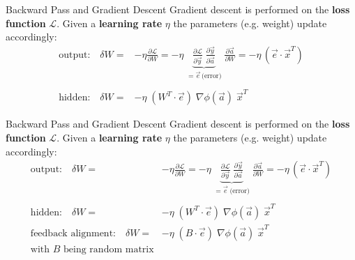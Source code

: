 \documentclass[12pt, aspectratio=169]{beamer}
\begin{document}
\begin{frame}{Backward Pass and Gradient Descent}
Gradient descent is performed on the \textbf{loss function} $\mathcal{L}$. Given a \textbf{learning rate} $\eta$ the parameters (e.g. weight) update accordingly:\\
\begin{align*}
   \text{output:} \quad \delta W =& - \eta \frac{\partial \mathcal{L}}{\partial W} 
            = - \eta \;
            \underbrace{\frac{\partial\mathcal{L}}{\partial \vec{y}} \;
                        \frac{\partial \vec{y}}{\partial \vec{a} }}_{=\vec{e}\, \text{(error)}} \;
              \frac{\partial \vec{a}}{\partial W}
            = - \eta \, (\vec{e} \cdot \vec{x}^T)\\
            \\ 
   \text{hidden:} \quad \delta W =& - \eta \;
                                (W^T \cdot \vec{e}) \;
                                \nabla \phi(\vec{a}) \;
                                \vec{x}^T
\end{align*}
\end{frame}

\begin{frame}{Backward Pass and Gradient Descent}
Gradient descent is performed on the \textbf{loss function} $\mathcal{L}$. Given a \textbf{learning rate} $\eta$ the parameters (e.g. weight) update accordingly:\\
\begin{align*}
   \text{output:} \quad \delta W =& - \eta \frac{\partial \mathcal{L}}{\partial W} 
            = - \eta \;
            \underbrace{\frac{\partial\mathcal{L}}{\partial \vec{y}} \;
                        \frac{\partial \vec{y}}{\partial \vec{a} }}_{=\vec{e}\; \text{(error)}} \;
              \frac{\partial \vec{a}}{\partial W}
            = - \eta \, (\vec{e} \cdot \vec{x}^T)\\
            \\ 
   \text{hidden:} \quad \delta W =& - \eta \;
                                (W^T \cdot \vec{e}) \;
                                \nabla \phi(\vec{a}) \;
                                \vec{x}^T\\
   \text{feedback alignment:} \quad \delta W =& - \eta \;
                                (B \cdot \vec{e}) \;
                                \nabla \phi(\vec{a}) \;
                                \vec{x}^T\;\\
    \text{with } B \text{ being random matrix}
\end{align*}
\end{frame}
\end{document}

